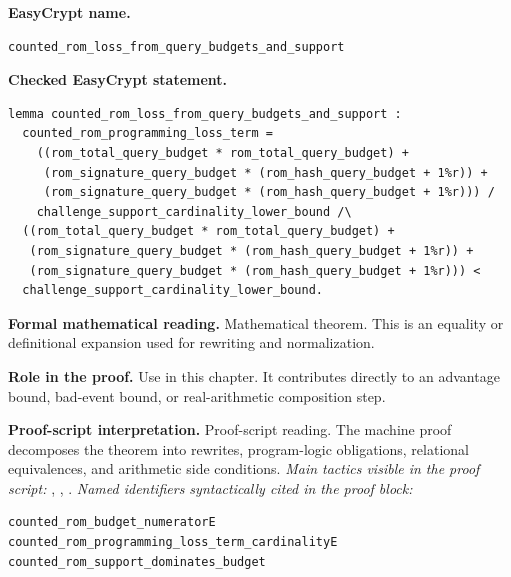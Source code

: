 \begin{formaltheorem}
\noindent\textbf{EasyCrypt name.}
\begin{lstlisting}[language=EasyCrypt,basicstyle=\ttfamily\scriptsize]
counted_rom_loss_from_query_budgets_and_support
\end{lstlisting}
\noindent\textbf{Checked EasyCrypt statement.}
\begin{lstlisting}[language=EasyCrypt,basicstyle=\ttfamily\scriptsize]
lemma counted_rom_loss_from_query_budgets_and_support :
  counted_rom_programming_loss_term =
    ((rom_total_query_budget * rom_total_query_budget) +
     (rom_signature_query_budget * (rom_hash_query_budget + 1%r)) +
     (rom_signature_query_budget * (rom_hash_query_budget + 1%r))) /
    challenge_support_cardinality_lower_bound /\
  ((rom_total_query_budget * rom_total_query_budget) +
   (rom_signature_query_budget * (rom_hash_query_budget + 1%r)) +
   (rom_signature_query_budget * (rom_hash_query_budget + 1%r))) <
  challenge_support_cardinality_lower_bound.
\end{lstlisting}
\noindent\textbf{Formal mathematical reading.}
Mathematical theorem. This is an equality or definitional expansion used for rewriting and normalization.

\noindent\textbf{Role in the proof.}
Use in this chapter. It contributes directly to an advantage bound, bad-event bound, or real-arithmetic composition step.

\noindent\textbf{Proof-script interpretation.}
Proof-script reading. The machine proof decomposes the theorem into rewrites, program-logic obligations, relational equivalences, and arithmetic side conditions.
\emph{Main tactics visible in the proof script:} \ec{split}, \ec{apply}, \ec{rewrite}.
\emph{Named identifiers syntactically cited in the proof block:}
\begin{lstlisting}[language=EasyCrypt,basicstyle=\ttfamily\scriptsize]
counted_rom_budget_numeratorE
counted_rom_programming_loss_term_cardinalityE
counted_rom_support_dominates_budget
\end{lstlisting}

\end{formaltheorem}

